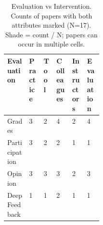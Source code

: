 \begin{table}[!htbp]
\centering
\small
\setlength{\tabcolsep}{4pt}
\renewcommand{\arraystretch}{1.3}
\caption{Evaluation vs Intervention. Counts of papers with both attributes marked (N=17). Shade = count / N; papers can occur in multiple cells.}
\begin{tabularx}{\linewidth}{|>{\raggedright\arraybackslash}p{0.23\linewidth}|>{\centering\arraybackslash}X|>{\centering\arraybackslash}X|>{\centering\arraybackslash}X|>{\centering\arraybackslash}X|>{\centering\arraybackslash}X|}
\hline
\textbf{Evaluation} & \textbf{\hspace{0pt}Practice} & \textbf{\hspace{0pt}Tool} & \textbf{\hspace{0pt}Colleagues} & \textbf{\hspace{0pt}Instructors} & \textbf{\hspace{0pt}Evaluation} \\ \hline
Grades & \cellcolor{purple!18}3 & \cellcolor{purple!12}2 & \cellcolor{purple!24}4 & \cellcolor{purple!12}2 & \cellcolor{purple!24}4 \\ \hline
Participation & \cellcolor{purple!18}3 & \cellcolor{purple!12}2 & \cellcolor{purple!12}2 & \cellcolor{purple!6}1 & \cellcolor{purple!6}1 \\ \hline
Opinion & \cellcolor{purple!18}3 & \cellcolor{purple!18}3 & \cellcolor{purple!18}3 & \cellcolor{purple!12}2 & \cellcolor{purple!18}3 \\ \hline
Deep Feedback & \cellcolor{purple!6}1 & \cellcolor{purple!6}1 & \cellcolor{purple!12}2 & \cellcolor{purple!6}1 & \cellcolor{purple!6}1 \\ \hline
\end{tabularx}
\end{table}
